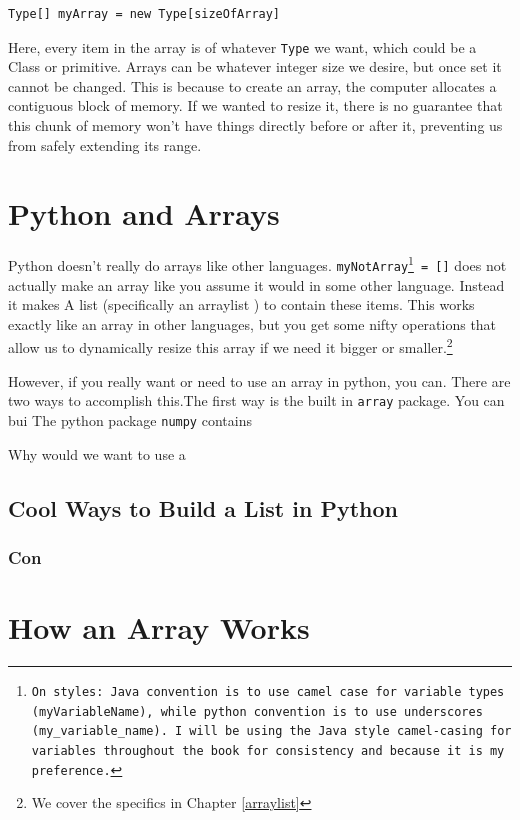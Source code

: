 \documentclass[10pt,a4paper]{book}
\begin{document}
\begin{verbatim}
Type[] myArray = new Type[sizeOfArray]
\end{verbatim}


Here, every item in the array is of whatever \texttt{Type} we want, which could be a Class or primitive.   Arrays can be whatever integer size we desire, but once set it cannot be changed.
This is because to create an array, the computer allocates a contiguous block of memory.
If we wanted to resize it, there is no guarantee that this chunk of memory won't have things directly before or after it, preventing us from safely extending its range.

\section{Python and Arrays}
Python doesn't really do arrays like other languages.
\texttt{myNotArray\footnote{On styles:  Java convention is to use camel case for variable types (\texttt{myVariableName}), while python convention is to use underscores (\texttt{my\_variable\_name}).  I will be using the Java style camel-casing for variables throughout the book for consistency and because it is my preference.} = []} does not actually make an array like you assume it would in some other language.  Instead it makes A list (specifically an arraylist ) to contain these items.
This works exactly like an array in other languages, but you get some nifty operations that allow us to dynamically resize this array if we need it bigger or smaller.\footnote{We cover the specifics in Chapter \ref{arraylist}}



However, if you really want or need to use an array in python, you can.
There are two ways to accomplish this.The first way is the built in \texttt{array} package.  You can bui  The python package \texttt{numpy} contains

Why would we want to use a 


\subsection{Cool Ways to Build a List in Python}


\subsubsection{Con}




\section{How an Array Works}
\end{document}

